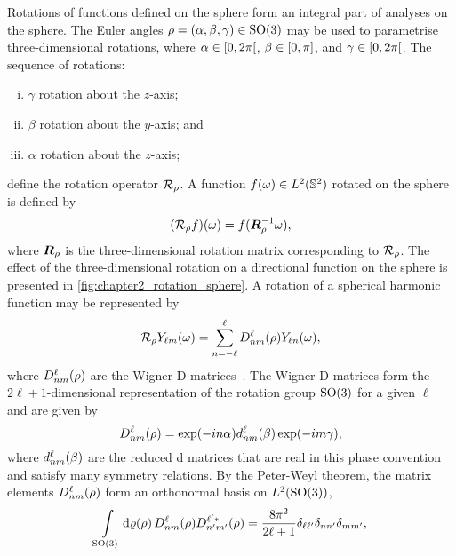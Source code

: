 Rotations of functions defined on the sphere form an integral part of analyses on the sphere.
The Euler angles \(\rho=(\alpha,\beta,\gamma) \in \rotationGroup{}\) may be used to parametrise three-dimensional rotations, where \(\alpha \in \interval[open right]{0}{2\pi}\), \(\beta \in \interval{0}{\pi}\), and \(\gamma \in \interval[open right]{0}{2\pi}\).
The sequence of rotations:
%
\begin{enumerate}[(i),nosep,left=\parindent]
    \item \({\gamma}\) rotation about the \(z\)-axis;
    \item \({\beta}\) rotation about the \(y\)-axis; and
    \item \({\alpha}\) rotation about the \(z\)-axis;
\end{enumerate}
%
define the rotation operator \(\rotation{\rho}\).
A function \(\pixel{f} \in \hilbert{\twoSphere}\) rotated on the sphere is defined by
%
\begin{equation}\label{eq:chapter2_rotation_matrix}
    \pixel{(\rotation{\rho}f)}
    = f(\rotationMatrix^{-1} \omega),
\end{equation}
%
where \(\rotationMatrix{}\) is the three-dimensional rotation matrix corresponding to \(\rotation{\rho}\).
The effect of the three-dimensional rotation on a directional function on the sphere is presented in \cref{fig:chapter2_rotation_sphere}.
A rotation of a spherical harmonic function may be represented by
%
\begin{equation}\label{eq:chapter2_rotate_spherical_harmonics}
    \rotation{\rho} \pixel{\harmonic{Y}}
    = \wignerSum \wigner{\ell}{n}{m}(\rho) \pixel{Y_{\ell n}},
\end{equation}
%
where \(\wigner{\ell}{n}{m}(\rho)\) are the Wigner D matrices~\cite{Brink1993,Ritchie1999}.
The Wigner D matrices form the \(2\ell+1\)-dimensional representation of the rotation group \(\rotationGroup{}\) for a given \(\ell{}\) and are given by
%
\begin{equation}
    \wigner{\ell}{n}{m}(\rho)
    = \exp(-i n\alpha) \reducedWigner{\ell}{n}{m}(\beta) \exp(-i m\gamma),
\end{equation}
%
where \(\reducedWigner{\ell}{n}{m}(\beta)\) are the reduced d matrices that are real in this phase convention and satisfy many symmetry relations.
By the Peter-Weyl theorem, the matrix elements \(\wigner{\ell}{n}{m}(\rho)\) form an orthonormal basis on \(\hilbert{\rotationGroup}\), \ie{}
%
\begin{equation}
    \integrateRotation{\rho} \wigner{\ell}{n}{m}(\rho) \wigner[\ast]{\ell'}{n'}{m'}(\rho)
    = \frac{8\pi^{2}}{2\ell+1} \delta_{\ell\ell'} \delta_{n n'} \delta_{mm'},
\end{equation}
